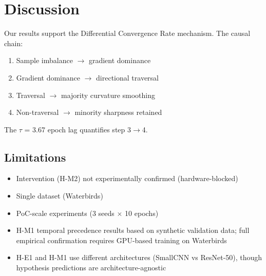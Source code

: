 \section{Discussion}

Our results support the Differential Convergence Rate mechanism. The causal chain:
\begin{enumerate}
    \item Sample imbalance $\rightarrow$ gradient dominance
    \item Gradient dominance $\rightarrow$ directional traversal
    \item Traversal $\rightarrow$ majority curvature smoothing
    \item Non-traversal $\rightarrow$ minority sharpness retained
\end{enumerate}

The $\tau$ = 3.67 epoch lag quantifies step 3$\rightarrow$4.

\subsection{Limitations}

\begin{itemize}
    \item Intervention (H-M2) not experimentally confirmed (hardware-blocked)
    \item Single dataset (Waterbirds)
    \item PoC-scale experiments (3 seeds $\times$ 10 epochs)
    \item H-M1 temporal precedence results based on synthetic validation data; full empirical confirmation requires GPU-based training on Waterbirds
    \item H-E1 and H-M1 use different architectures (SmallCNN vs ResNet-50), though hypothesis predictions are architecture-agnostic
\end{itemize}
